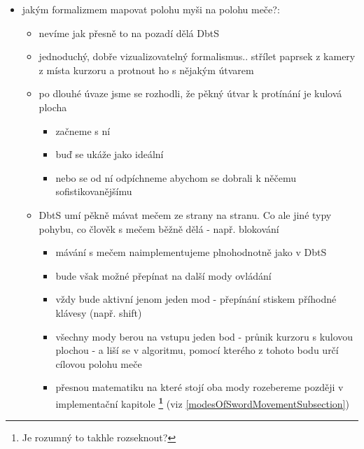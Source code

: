 \begin{itemize}
\begin{itemize}
        \end{itemize}
    \item jakým formalizmem mapovat polohu myši na polohu meče?:
        \begin{itemize}
            \item nevíme jak přesně to na pozadí dělá DbtS
            \item jednoduchý, dobře vizualizovatelný formalismus.. střílet paprsek z kamery z místa kurzoru a protnout ho s nějakým útvarem 
            \item po dlouhé úvaze jsme se rozhodli, že pěkný útvar k protínání je kulová plocha
                \begin{itemize}
                    \item začneme s ní
                    \item buď se ukáže jako ideální
                    \item nebo se od ní odpíchneme abychom se dobrali k něčemu sofistikovanějšímu
                \end{itemize}
            \item DbtS umí pěkně mávat mečem ze strany na stranu. Co ale jiné typy pohybu, co člověk s mečem běžně dělá - např. blokování
                \begin{itemize}
                    \item mávání s mečem naimplementujeme plnohodnotně jako v DbtS 
                    \item bude však možné přepínat na další mody ovládání
                    \item vždy bude aktivní jenom jeden mod - přepínání stiskem příhodné klávesy (např. shift)
                    \item všechny mody berou na vstupu jeden bod - průnik kurzoru s kulovou plochou - a liší se v algoritmu, pomocí kterého z tohoto bodu určí cílovou polohu meče
                    \item přesnou matematiku na které stojí oba mody rozebereme později v implementační kapitole \textbf{\footnote{Je rozumný to takhle rozseknout?}} (viz \ref{modesOfSwordMovementSubsection})
                \end{itemize}
        \end{itemize}
\end{itemize}

